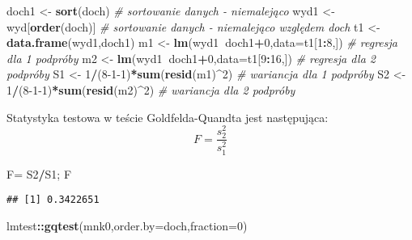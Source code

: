 \documentclass[polish,]{book}
\newenvironment{Shaded}{\begin{snugshade}}{\end{snugshade}}
\newcommand{\CommentTok}[1]{\textcolor[rgb]{0.56,0.35,0.01}{\textit{#1}}}
\newcommand{\DataTypeTok}[1]{\textcolor[rgb]{0.13,0.29,0.53}{#1}}
\newcommand{\DecValTok}[1]{\textcolor[rgb]{0.00,0.00,0.81}{#1}}
\newcommand{\KeywordTok}[1]{\textcolor[rgb]{0.13,0.29,0.53}{\textbf{#1}}}
\newcommand{\NormalTok}[1]{#1}
\newcommand{\OperatorTok}[1]{\textcolor[rgb]{0.81,0.36,0.00}{\textbf{#1}}}
\newcommand{\StringTok}[1]{\textcolor[rgb]{0.31,0.60,0.02}{#1}}
\begin{document}
\begin{Shaded}
\begin{Highlighting}[]
\NormalTok{doch1 <-}\StringTok{ }\KeywordTok{sort}\NormalTok{(doch)      }\CommentTok{# sortowanie danych - niemalejąco}
\NormalTok{wyd1 <-}\StringTok{ }\NormalTok{wyd[}\KeywordTok{order}\NormalTok{(doch)] }\CommentTok{# sortowanie danych - niemalejąco względem doch}
\NormalTok{t1 <-}\StringTok{ }\KeywordTok{data.frame}\NormalTok{(wyd1,doch1)}
\NormalTok{m1 <-}\StringTok{ }\KeywordTok{lm}\NormalTok{(wyd1}\OperatorTok{~}\NormalTok{doch1}\OperatorTok{+}\DecValTok{0}\NormalTok{,}\DataTypeTok{data=}\NormalTok{t1[}\DecValTok{1}\OperatorTok{:}\DecValTok{8}\NormalTok{,])  }\CommentTok{# regresja dla 1 podpróby}
\NormalTok{m2 <-}\StringTok{ }\KeywordTok{lm}\NormalTok{(wyd1}\OperatorTok{~}\NormalTok{doch1}\OperatorTok{+}\DecValTok{0}\NormalTok{,}\DataTypeTok{data=}\NormalTok{t1[}\DecValTok{9}\OperatorTok{:}\DecValTok{16}\NormalTok{,]) }\CommentTok{# regresja dla 2 podpróby}
\NormalTok{S1 <-}\StringTok{ }\DecValTok{1}\OperatorTok{/}\NormalTok{(}\DecValTok{8-1-1}\NormalTok{)}\OperatorTok{*}\KeywordTok{sum}\NormalTok{(}\KeywordTok{resid}\NormalTok{(m1)}\OperatorTok{^}\DecValTok{2}\NormalTok{) }\CommentTok{# wariancja dla 1 podpróby}
\NormalTok{S2 <-}\StringTok{ }\DecValTok{1}\OperatorTok{/}\NormalTok{(}\DecValTok{8-1-1}\NormalTok{)}\OperatorTok{*}\KeywordTok{sum}\NormalTok{(}\KeywordTok{resid}\NormalTok{(m2)}\OperatorTok{^}\DecValTok{2}\NormalTok{) }\CommentTok{# wariancja dla 2 podpróby}
\end{Highlighting}
\end{Shaded}

Statystyka testowa w teście Goldfelda-Quandta jest następująca:
\begin{equation}
F=\frac{s_2^2}{s_1^2}
\label{eq:wz1315}
\end{equation}

\begin{Shaded}
\begin{Highlighting}[]
\NormalTok{F=}\StringTok{ }\NormalTok{S2}\OperatorTok{/}\NormalTok{S1; F}
\end{Highlighting}
\end{Shaded}

\begin{verbatim}
## [1] 0.3422651
\end{verbatim}

\begin{Shaded}
\begin{Highlighting}[]
\NormalTok{lmtest}\OperatorTok{::}\KeywordTok{gqtest}\NormalTok{(mnk0,}\DataTypeTok{order.by=}\NormalTok{doch,}\DataTypeTok{fraction=}\DecValTok{0}\NormalTok{)}
\end{Highlighting}
\end{Shaded}
\end{document}
